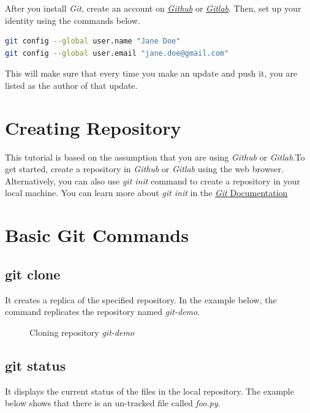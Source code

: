 \documentclass[letterpaper]{article}
\begin{document}
After you install \textit{Git}, create an account on \href{https://github.com/}{\textit{Github}} or \href{https://about.gitlab.com/}{\textit{Gitlab}}.
Then, set up your identity using the commands below.\\

\begin{lstlisting}[language=Bash]
git config --global user.name "Jane Doe"
git config --global user.email "jane.doe@gmail.com"
\end{lstlisting}

This will make sure that every time you make an update and push it, you are listed as the author of that update.\\

\section{Creating Repository}
This tutorial is based on the assumption that you are using \textit{Github} or \textit{Gitlab}.To get started, create a repository in \textit{Github} or \textit{Gitlab} using the web browser. \\

Alternatively, you can also use \textit{git init} command to create a repository in your local machine. You can learn more about \textit{git init} in the \href{https://git-scm.com/docs/git-init}{\textit{Git} Documentation}

\section{Basic Git Commands}
\subsection{git clone}
It creates a replica of the specified repository. In the example below, the command replicates the repository named \textit{git-demo}.

 \begin{figure}[h]
    \centering
    \caption{Cloning repository \textit{git-demo}}
  \end{figure}

\subsection{git status}
It displays the current status of the files in the local repository. The example below shows that there is an un-tracked file called \textit{foo.py}.
\end{document}
